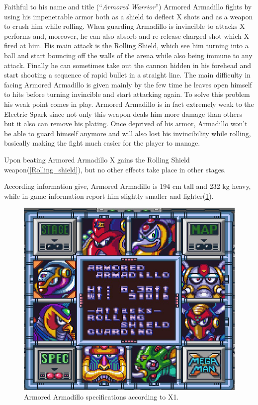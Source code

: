 Faithful to his name and title (``\textit{Armored Warrior}''\cite{book:MMX_Complete_art}) Armored Armadillo fights by using his impenetrable armor both as a shield to deflect X shots and as a weapon to crush him while rolling. When guarding Armadillo is invincible to attacks X performs and, moreover, he can also absorb and re-release charged shot which X fired at him. His main attack is the Rolling Shield, which see him turning into a ball and start bouncing off the walls of the arena while also being immune to any attack. Finally he can sometimes take out the cannon hidden in his forehead and start shooting a sequence of rapid bullet in a straight line. The main difficulty in facing Armored Armadillo is given mainly by the few time he leaves open himself to hits before turning invincible and start attacking again. To solve this problem his weak point comes in play. Armored Armadillo is in fact extremely weak to the Electric Spark since not only this weapon deals him more damage than others but it also can remove his plating. Once deprived of his armor, Armadillo won't be able to guard himself anymore and will also lost his invincibility while rolling, basically making the fight much easier for the player to manage.

Upon beating Armored Armadillo X gains the Rolling Shield weapon(\ref{Rolling_shield}), but no other effects take place in other stages.

According information give, Armored Armadillo is 194 cm tall and 232 kg heavy, while in-game information report him slightly smaller and lighter(\ref{Armadillo_specs}).

\begin{figure}[h]
	\centering
	\includegraphics[width=0.5\linewidth]{figures/X1/Armored_armadillo_specs.png}
	\caption{Armored Armadillo specifications according to X1.}
	\label{Armadillo_specs}
\end{figure}
